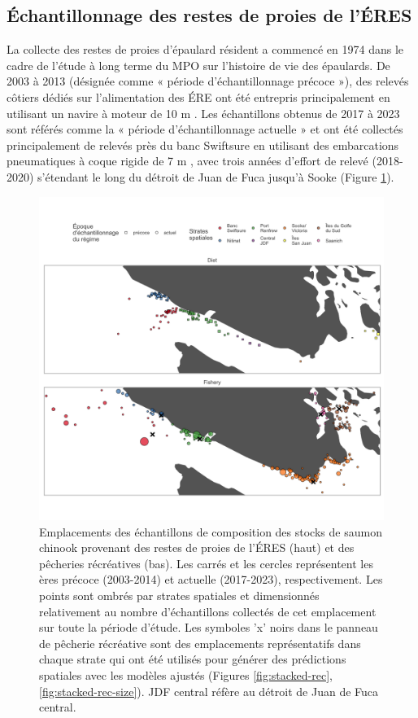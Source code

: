 \subsection{Échantillonnage des restes de proies de l'ÉRES}

La collecte des restes de proies d'épaulard résident a commencé en 1974 dans le cadre de l'étude à long terme du MPO sur l'histoire de vie des épaulards. De 2003 à 2013 (désignée comme « période d'échantillonnage précoce »), des relevés côtiers dédiés sur l'alimentation des ÉRE ont été entrepris principalement en utilisant un navire à moteur de 10 m \citep{fordChinookSalmonPredation2010, fordLinkingKillerWhale2010}. Les échantillons obtenus de 2017 à 2023 sont référés comme la « période d'échantillonnage actuelle » et ont été collectés principalement de relevés près du banc Swiftsure en utilisant des embarcations pneumatiques à coque rigide de 7 m \citep{thorntonSouthernResidentKiller2022}, avec trois années d'effort de relevé (2018-2020) s'étendant le long du détroit de Juan de Fuca jusqu'à Sooke (Figure \ref{fig:sampling-map}).

\begin{figure}[H]
    \centering
    \includegraphics[width=5in]{figs/sampling_map.png}
    \caption{Emplacements des échantillons de composition des stocks de saumon chinook provenant des restes de proies de l'ÉRES (haut) et des pêcheries récréatives (bas). Les carrés et les cercles représentent les ères précoce (2003-2014) et actuelle (2017-2023), respectivement. Les points sont ombrés par strates spatiales et dimensionnés relativement au nombre d'échantillons collectés de cet emplacement sur toute la période d'étude. Les symboles 'x' noirs dans le panneau de pêcherie récréative sont des emplacements représentatifs dans chaque strate qui ont été utilisés pour générer des prédictions spatiales avec les modèles ajustés (Figures \ref{fig:stacked-rec}, \ref{fig:stacked-rec-size}). JDF central réfère au détroit de Juan de Fuca central.}
    \label{fig:sampling-map}
\end{figure}

